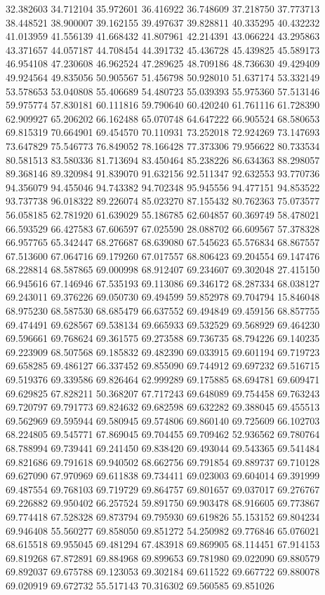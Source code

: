 32.382603
34.712104
35.972601
36.416922
36.748609
37.218750
37.773713
38.448521
38.900007
39.162155
39.497637
39.828811
40.335295
40.432232
41.013959
41.556139
41.668432
41.807961
42.214391
43.066224
43.295863
43.371657
44.057187
44.708454
44.391732
45.436728
45.439825
45.589173
46.954108
47.230608
46.962524
47.289625
48.709186
48.736630
49.429409
49.924564
49.835056
50.905567
51.456798
50.928010
51.637174
53.332149
53.578653
53.040808
55.406689
54.480723
55.039393
55.975360
57.513146
59.975774
57.830181
60.111816
59.790640
60.420240
61.761116
61.728390
62.909927
65.206202
66.162488
65.070748
64.647222
66.905524
68.580653
69.815319
70.664901
69.454570
70.110931
73.252018
72.924269
73.147693
73.647829
75.546773
76.849052
78.166428
77.373306
79.956622
80.733534
80.581513
83.580336
81.713694
83.450464
85.238226
86.634363
88.298057
89.368146
89.320984
91.839070
91.632156
92.511347
92.632553
93.770736
94.356079
94.455046
94.743382
94.702348
95.945556
94.477151
94.853522
93.737738
96.018322
89.226074
85.023270
87.155432
80.762363
75.073577
56.058185
62.781920
61.639029
55.186785
62.604857
60.369749
58.478021
66.593529
66.427583
67.606597
67.025590
28.088702
66.609567
57.378328
66.957765
65.342447
68.276687
68.639080
67.545623
65.576834
68.867557
67.513600
67.064716
69.179260
67.017557
68.806423
69.204554
69.147476
68.228814
68.587865
69.000998
68.912407
69.234607
69.302048
27.415150
66.945616
67.146946
67.535193
69.113086
69.346172
68.287334
68.038127
69.243011
69.376226
69.050730
69.494599
59.852978
69.704794
15.846048
68.975230
68.587530
68.685479
66.637552
69.494849
69.459156
68.857755
69.474491
69.628567
69.538134
69.665933
69.532529
69.568929
69.464230
69.596661
69.768624
69.361575
69.273588
69.736735
68.794226
69.140235
69.223909
68.507568
69.185832
69.482390
69.033915
69.601194
69.719723
69.658285
69.486127
66.337452
69.855090
69.744912
69.697232
69.516715
69.519376
69.339586
69.826464
62.999289
69.175885
68.694781
69.609471
69.629825
67.828211
50.368207
67.717243
69.648089
69.754458
69.763243
69.720797
69.791773
69.824632
69.682598
69.632282
69.388045
69.455513
69.562969
69.595944
69.580945
69.574806
69.860140
69.725609
66.102703
68.224805
69.545771
67.869045
69.704455
69.709462
52.936562
69.780764
68.788994
69.739441
69.241450
69.838420
69.493044
69.543365
69.541484
69.821686
69.791618
69.940502
68.662756
69.791854
69.889737
69.710128
69.627090
67.970969
69.611838
69.734411
69.023003
69.604014
69.391999
69.487554
69.768103
69.719729
69.864757
69.801657
69.037017
69.276767
69.226882
69.950402
66.257524
59.891750
69.903478
68.916605
69.773867
69.774418
67.528328
69.873794
69.795930
69.619826
55.153152
69.804234
69.946408
55.560277
69.858050
69.851272
54.250982
69.776846
65.076021
68.615518
69.955045
69.481294
67.483918
69.869905
68.114451
67.914153
69.819268
67.872891
69.884968
69.899653
69.781980
69.022090
69.880579
69.892037
69.675788
69.123053
69.302184
69.611522
69.667722
69.880078
69.020919
69.672732
55.517143
70.316302
69.560585
69.851026
